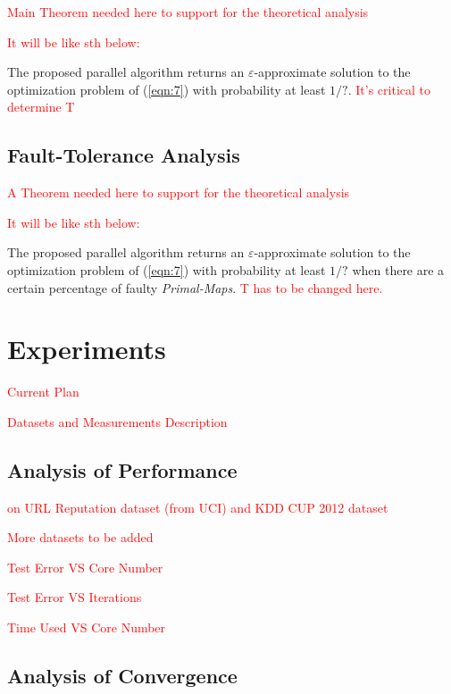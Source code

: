 \documentclass{llncs}
\newcommand{\comment}{\textcolor{red}}
\begin{document}
    \comment{Main Theorem needed here to support for the theoretical analysis}

    \comment{It will be like sth below:}
	
	\begin{theorem}
	The proposed parallel algorithm returns an $\varepsilon$-approximate solution to the optimization problem of (\ref{eqn:7}) with probability at least $1/?$. \comment{It's critical to determine T}
	\end{theorem}

\subsection{Fault-Tolerance Analysis}
    \comment{A Theorem needed here to support for the theoretical analysis}

    \comment{It will be like sth below:}
	
	\begin{theorem}
	The proposed parallel algorithm returns an $\varepsilon$-approximate solution to the optimization problem of (\ref{eqn:7}) with probability at least $1/?$ when there are a certain percentage of faulty \textit{Primal-Maps}. \comment{T has to be changed here.}
	\end{theorem}
	
\section{Experiments} \label{sec:experiment}

\comment{Current Plan}

\comment{Datasets and Measurements Description}

\subsection{Analysis of Performance}

\comment{on URL Reputation dataset (from UCI) and KDD CUP 2012 dataset}

\comment{More datasets to be added}

\comment{Test Error VS Core Number}

\comment{Test Error VS Iterations}

\comment{Time Used VS Core Number}

\subsection{Analysis of Convergence}
\end{document}
